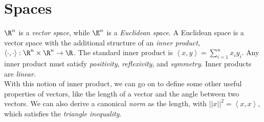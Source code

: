 \documentclass{notes}
\begin{document}
\section{Spaces}
$\R^n$ is a \emph{vector space}, while $\E^n$ is a \emph{Euclidean space}. A Euclidean space is a 
vector space with the additional structure of an \emph{inner product}, $\left<\cdot, \cdot\right>:
\R^n\times\R^n\to\R$. The standard inner product is $\left<x, y\right> = \sum_{i=1}^n x_iy_i$. Any 
inner product must satisfy \emph{positivity}, \emph{reflexivity}, and \emph{symmetry}. Inner products
are \emph{linear}. \\

With this notion of inner product, we can go on to define some other useful properties of vectors,
like the length of a vector and the angle between two vectors. We can also derive a canonical \emph{norm}
as the length, with $||x||^2 = \left<x,x\right>$, which satisfies the \emph{triangle inequality}.
\end{document}

